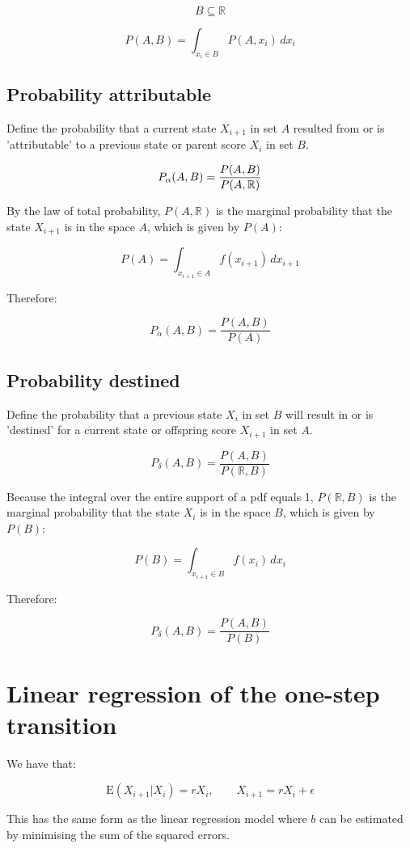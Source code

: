 \documentclass[a4paper,11pt]{article}
\begin{document}
$$B \subseteq \mathbb{R}$$

$$P(A, B) = \int_{x_i\in B}^{} P(A, x_i) \, dx_i$$

\subsection{Probability attributable}
Define the probability that a current state $X_{i+1}$ in set $A$ resulted from or is 'attributable' to a previous state or parent score $X_i$ in set $B$.

$$\large P_{\alpha}(A, B) = \frac{P(A, B)}{P(A, \mathbb{R})}$$

By the law of total probability, $P(A, \mathbb{R})$ is the marginal probability that the state $X_{i+1}$ is in the space $A$, which is given by $P(A)$:

$$P(A) = \int_{x_{i+1}\in A} f(x_{i+1}) \, dx_{i+1}$$

Therefore:

$$P_{\alpha}(A, B) = \frac{P(A, B)}{P(A)}$$




\subsection{Probability destined}
Define the probability that a previous state $X_i$ in set $B$ will result in or is 'destined' for a current state or offspring score $X_{i+1}$ in set $A$. 

$$P_{\delta}(A, B) = \frac{P(A, B)}{P(\mathbb{R}, B)}$$

Because the integral over the entire support of a pdf equals 1, $P(\mathbb{R}, B)$ is the marginal probability that the state $X_i$ is in the space $B$, which is given by $P(B)$:

$$P(B) = \int_{x_{i+1}\in B} f(x_i) \, dx_i$$



Therefore:

$$P_{\delta}(A, B) = \frac{P(A, B)}{P(B)}$$


\section{Linear regression of the one-step transition}

We have that:

$$\mathrm{E}(X_{i+1}|X_i) = rX_i, \qquad X_{i+1} = rX_i + \epsilon$$

This has the same form as the linear regression model where $b$ can be estimated by minimising the sum of the squared errors.
\end{document}
